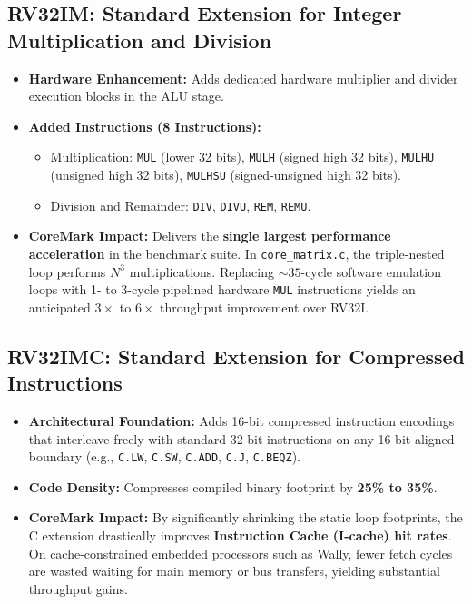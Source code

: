 \documentclass[11pt,a4paper]{article}
\begin{document}
\clearpage
\subsection{RV32IM: Standard Extension for Integer Multiplication and Division}
\begin{itemize}[leftmargin=1.4em]
    \item \textbf{Hardware Enhancement:} Adds dedicated hardware multiplier and divider execution blocks in the ALU stage.
    \item \textbf{Added Instructions (8 Instructions):}
    \begin{itemize}
        \item Multiplication: \texttt{MUL} (lower 32 bits), \texttt{MULH} (signed high 32 bits), \texttt{MULHU} (unsigned high 32 bits), \texttt{MULHSU} (signed-unsigned high 32 bits).
        \item Division and Remainder: \texttt{DIV}, \texttt{DIVU}, \texttt{REM}, \texttt{REMU}.
    \end{itemize}
    \item \textbf{CoreMark Impact:} Delivers the \textbf{single largest performance acceleration} in the benchmark suite. In \texttt{core\_matrix.c}, the triple-nested loop performs $N^3$ multiplications. Replacing ${\sim}35$-cycle software emulation loops with 1- to 3-cycle pipelined hardware \texttt{MUL} instructions yields an anticipated $3\times$ to $6\times$ throughput improvement over RV32I.
\end{itemize}

\subsection{RV32IMC: Standard Extension for Compressed Instructions}
\begin{itemize}[leftmargin=1.4em]
    \item \textbf{Architectural Foundation:} Adds 16-bit compressed instruction encodings that interleave freely with standard 32-bit instructions on any 16-bit aligned boundary (e.g., \texttt{C.LW}, \texttt{C.SW}, \texttt{C.ADD}, \texttt{C.J}, \texttt{C.BEQZ}).
    \item \textbf{Code Density:} Compresses compiled binary footprint by \textbf{25\% to 35\%}.
    \item \textbf{CoreMark Impact:} By significantly shrinking the static loop footprints, the C extension drastically improves \textbf{Instruction Cache (I-cache) hit rates}. On cache-constrained embedded processors such as Wally, fewer fetch cycles are wasted waiting for main memory or bus transfers, yielding substantial throughput gains.
\end{itemize}
\end{document}
